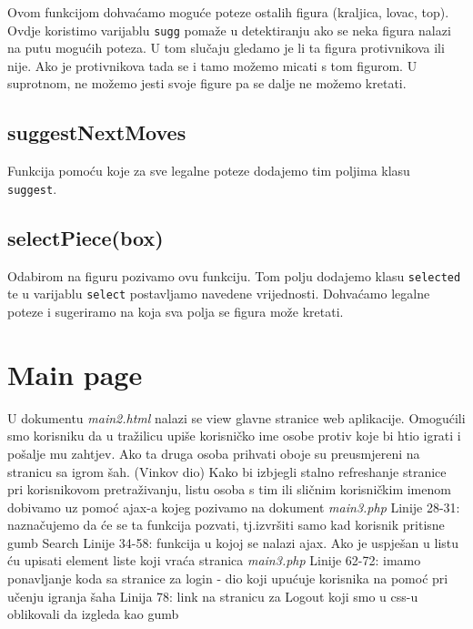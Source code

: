 \documentclass{article}
\begin{document}
Ovom funkcijom dohvaćamo moguće poteze ostalih figura (kraljica, lovac, top). Ovdje koristimo varijablu \verb|sugg| pomaže u detektiranju ako se neka figura nalazi na putu mogućih poteza. U tom slučaju gledamo je li ta figura protivnikova ili nije. Ako je protivnikova tada se i tamo možemo micati s tom figurom. U suprotnom, ne možemo jesti svoje figure pa se dalje ne možemo kretati.

\subsection{suggestNextMoves}

Funkcija pomoću koje za sve legalne poteze dodajemo tim poljima klasu \\
\verb|suggest|.

\subsection{selectPiece(box)}

Odabirom na figuru pozivamo ovu funkciju. Tom polju dodajemo klasu \verb|selected| te u varijablu \verb|select| postavljamo navedene vrijednosti. Dohvaćamo legalne poteze i sugeriramo na koja sva polja se figura može kretati.

\section{Main page}
U dokumentu  \textit{main2.html} nalazi se view glavne stranice web aplikacije. \newline \newline
Omogućili smo korisniku da u tražilicu upiše korisničko ime osobe protiv koje bi htio igrati i pošalje mu zahtjev. Ako ta druga osoba prihvati oboje su preusmjereni na stranicu sa igrom šah. (Vinkov dio)
\newline\newline
Kako bi izbjegli stalno refreshanje stranice pri korisnikovom pretraživanju, listu osoba s tim ili sličnim korisničkim imenom dobivamo uz pomoć ajax-a kojeg pozivamo na dokument \textit{main3.php}
\newline \newline
Linije 28-31: naznačujemo da će se ta funkcija pozvati, tj.izvršiti samo kad korisnik pritisne gumb Search
\newline \newline
Linije 34-58: funkcija u kojoj se nalazi ajax. Ako je uspješan u listu ću upisati element liste koji vraća stranica \textit{main3.php}
\newline \newline
Linije 62-72: imamo ponavljanje koda sa stranice za login - dio koji upućuje korisnika na pomoć pri učenju igranja šaha
\newline \newline
Linija 78: link na stranicu za Logout koji smo u css-u oblikovali da izgleda kao gumb\newline
\end{document}
